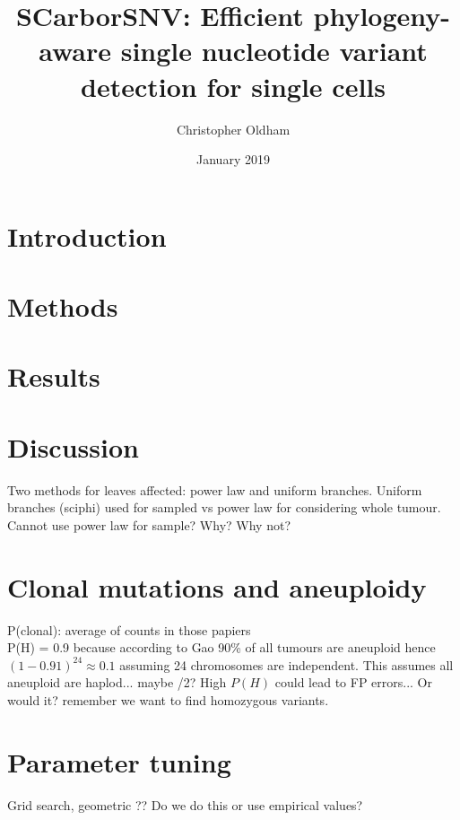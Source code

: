\documentclass{article}
\title{SCarborSNV: Efficient phylogeny-aware single nucleotide variant detection for single cells}
\author{Christopher Oldham}
\date{January 2019}
\begin{document}
%

\section{Introduction}
%

\section{Methods}


\section{Results}
\section{Discussion}

Two methods for leaves affected: power law and uniform branches. Uniform branches (sciphi) used for sampled vs power law for considering whole tumour. Cannot use power law for sample? Why? Why not?









\newpage
{}
%


\newpage
\appendix
\section{Clonal mutations and aneuploidy}
P(clonal): average of counts in those papiers\\
P(H) = 0.9 because according to Gao 90\% of all tumours are aneuploid hence $(1-0.91)^{24}\approx 0.1$ assuming 24 chromosomes are independent. This assumes all aneuploid are haplod... maybe /2? High $P(H)$ could lead to FP errors... Or would it? remember we want to find homozygous variants.
\section{Parameter tuning}
Grid search, geometric ?? Do we do this or use empirical values?
\end{document}
